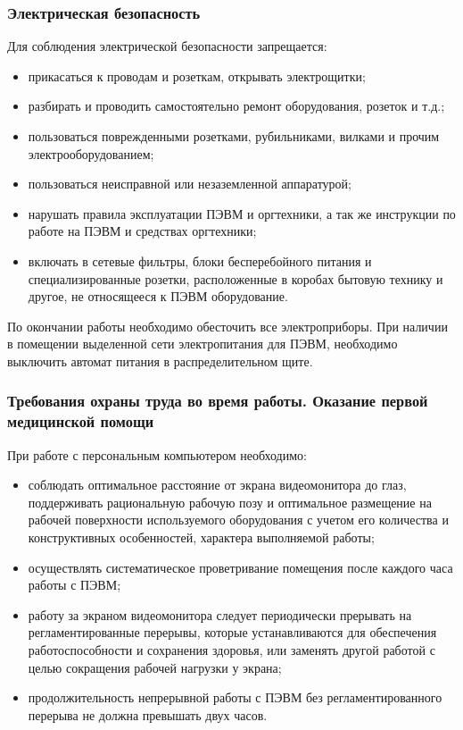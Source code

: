 \subsubsection{Электрическая безопасность}

Для соблюдения электрической безопасности запрещается: 
\begin{itemize}
 \item прикасаться к проводам и розеткам, открывать электрощитки;
 \item разбирать и проводить самостоятельно ремонт оборудования, розеток и т.д.;
 \item пользоваться поврежденными розетками, рубильниками, вилками и прочим электрооборудованием;
 \item пользоваться неисправной или незаземленной аппаратурой;
 \item нарушать правила эксплуатации ПЭВМ и оргтехники, а так же инструкции по работе на ПЭВМ и 
средствах оргтехники;
 \item включать в сетевые фильтры, блоки бесперебойного питания и 
специализированные розетки, расположенные в коробах бытовую технику и другое, 
не относящееся к ПЭВМ оборудование.
\end{itemize}

По окончании работы необходимо обесточить все электроприборы. При наличии в 
помещении выделенной сети электропитания для ПЭВМ, необходимо выключить автомат питания 
в распределительном щите.

\subsubsection{Требования охраны труда во время работы. Оказание первой медицинской помощи}

При работе с персональным компьютером необходимо:
\begin{itemize}
 \item соблюдать оптимальное расстояние от экрана видеомонитора до глаз, поддерживать 
рациональную рабочую позу и оптимальное размещение на рабочей поверхности используемого 
оборудования с учетом его количества и конструктивных особенностей, характера выполняемой работы;
 \item осуществлять систематическое проветривание помещения после каждого часа работы с ПЭВМ;
 \item работу за экраном видеомонитора следует периодически прерывать на регламентированные 
перерывы, которые устанавливаются для обеспечения работоспособности и сохранения здоровья, 
или заменять другой работой с целью сокращения рабочей нагрузки у экрана;
 \item продолжительность непрерывной работы с ПЭВМ без регламентированного перерыва не должна превышать двух часов.
\end{itemize}

